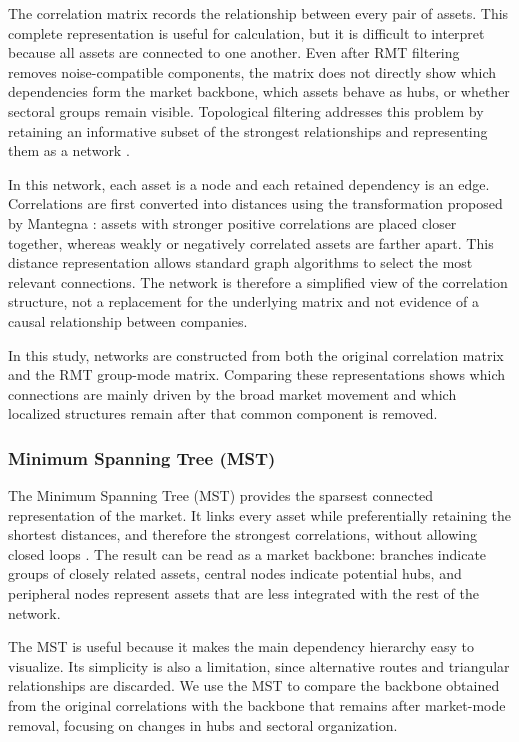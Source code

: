 The correlation matrix records the relationship between every pair of assets. This complete representation is useful for calculation, but it is difficult to interpret because all assets are connected to one another. Even after RMT filtering removes noise-compatible components, the matrix does not directly show which dependencies form the market backbone, which assets behave as hubs, or whether sectoral groups remain visible. Topological filtering addresses this problem by retaining an informative subset of the strongest relationships and representing them as a network \cite{tumminello_2010_correlation}.

In this network, each asset is a node and each retained dependency is an edge. Correlations are first converted into distances using the transformation proposed by Mantegna \cite{mantegna_1999_hierarchical}: assets with stronger positive correlations are placed closer together, whereas weakly or negatively correlated assets are farther apart. This distance representation allows standard graph algorithms to select the most relevant connections. The network is therefore a simplified view of the correlation structure, not a replacement for the underlying matrix and not evidence of a causal relationship between companies.

In this study, networks are constructed from both the original correlation matrix and the RMT group-mode matrix. Comparing these representations shows which connections are mainly driven by the broad market movement and which localized structures remain after that common component is removed.

\subsubsection{Minimum Spanning Tree (MST)}
The Minimum Spanning Tree (MST) provides the sparsest connected representation of the market. It links every asset while preferentially retaining the shortest distances, and therefore the strongest correlations, without allowing closed loops \cite{mantegna_1999_hierarchical,bonanno_2004_networks}. The result can be read as a market backbone: branches indicate groups of closely related assets, central nodes indicate potential hubs, and peripheral nodes represent assets that are less integrated with the rest of the network.

The MST is useful because it makes the main dependency hierarchy easy to visualize. Its simplicity is also a limitation, since alternative routes and triangular relationships are discarded. We use the MST to compare the backbone obtained from the original correlations with the backbone that remains after market-mode removal, focusing on changes in hubs and sectoral organization.

